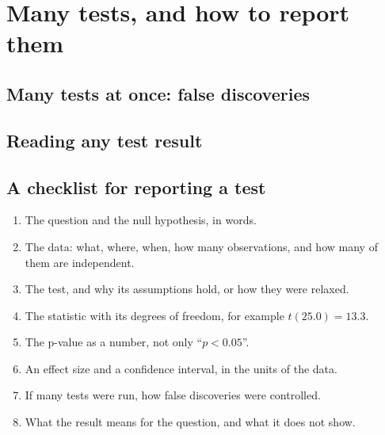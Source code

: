 \chapter{Many tests, and how to report them}\label{ch:many}
\section{Many tests at once: false discoveries}

\section{Reading any test result}


\section{A checklist for reporting a test}
\begin{enumerate}
\item The question and the null hypothesis, in words.
\item The data: what, where, when, how many observations, and how many of them are independent.
\item The test, and why its assumptions hold, or how they were relaxed.
\item The statistic with its degrees of freedom, for example $t(25.0) = 13.3$.
\item The p-value as a number, not only ``$p<0.05$''.
\item An effect size and a confidence interval, in the units of the data.
\item If many tests were run, how false discoveries were controlled.
\item What the result means for the question, and what it does not show.
\end{enumerate}

